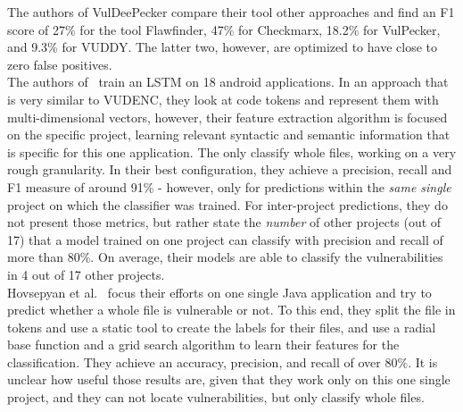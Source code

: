 \documentclass[
a4paper,
pagesize,
pdftex,
12pt,
twoside, %
BCOR=5mm, %
ngerman,
fleqn,
final,
]{scrartcl}
\begin{document}
	The authors of VulDeePecker compare their tool other approaches and find an F1 score of 27\% for the tool Flawfinder, 47\% for Checkmarx, 18.2\% for VulPecker, and 9.3\% for VUDDY. The latter two, however, are optimized to have close to zero false positives.\\
	
	The authors of~\cite{Dam.2017} train an LSTM on 18 android applications. In an approach that is very similar to VUDENC, they look at code tokens and represent them with multi-dimensional vectors, however, their feature extraction algorithm is focused on the specific project, learning relevant syntactic and semantic information that is specific for this one application. The only classify whole files, working on a very rough granularity. In their best configuration, they achieve a precision, recall and F1 measure of around 91\% - however, only for predictions within the \textit{same single} project on which the classifier was trained. For inter-project predictions, they do not present those metrics, but rather state the \textit{number} of other projects (out of 17) that a model trained on one project can classify with precision and recall of more than 80\%. On average, their models are able to classify the vulnerabilities in 4 out of 17 other projects.\\
	
	Hovsepyan et al.~\cite{Hovsepyan.2012} focus their efforts on one single Java application and try to predict whether a whole file is vulnerable or not. To this end, they split the file in tokens and use a static tool to create the labels for their files, and use a radial base function and a grid search algorithm to learn their features for the classification. They achieve an accuracy, precision, and recall of over 80\%. It is unclear how useful those results are, given that they work only on this one single project, and they can not locate vulnerabilities, but only classify whole files. 
	
\end{document}
